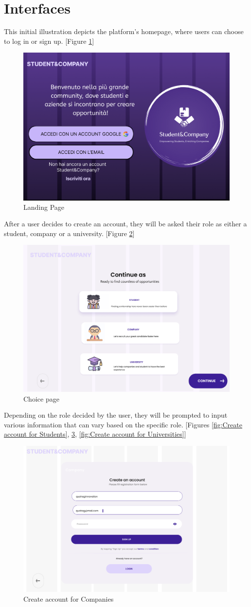 \section{Interfaces}

This initial illustration depicts the platform's homepage, where users can choose to log in or sign up. [Figure \ref{fig:Landing Page}]

\begin{figure}[H]
    \centering
    \includegraphics[width=0.5\linewidth]{Images/Interface Images//log in sing up/image.png}
    \caption{Landing Page}
    \label{fig:Landing Page}
\end{figure}

After a user decides to create an account, they will be asked their role as either a student, company or a university. [Figure \ref{fig:Choice page}] 

\begin{figure} [H]
    \centering
    \includegraphics[width=0.5\linewidth]{Images/Interface Images/log in sing up/Screenshot 2024-12-03 110046.png}
    \caption{Choice page}
    \label{fig:Choice page}
\end{figure}

Depending on the role decided by the user, they will be prompted to input various information that can vary based on the specific role. [Figures \ref{fig:Create account for Students}, \ref{fig: Create account for companies}, \ref{fig:Create account for Universities}] 

\begin{figure} [H]
    \centering
    \includegraphics[width=0.5\linewidth]{Images/Interface Images/log in sing up/Screenshot 2024-12-12 045014.png}
    \caption{Create account for Companies }
    \label{fig: Create account for companies}
\end{figure}

